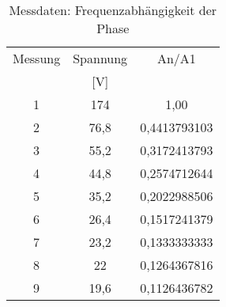 
\begin{table}[h!]
  \centering
  \caption{Messdaten: Frequenzabhängigkeit der Phase}
  \label{tab:amp}
  \begin{tabular}{c c c}
    \toprule
Messung & Spannung & An/A1\\
 & [V] \\
    \midrule


1	& 174   & 		1,00\\
2	& 76,8  & 		0,4413793103\\
3	& 55,2  & 		0,3172413793\\
4	& 44,8  & 		0,2574712644\\
5	& 35,2  & 		0,2022988506\\
6	& 26,4  & 		0,1517241379\\
7	& 23,2  & 		0,1333333333\\
8	& 22		&     0,1264367816\\
9	& 19,6  & 		0,1126436782\\




    \bottomrule
  \end{tabular}
\end{table}
